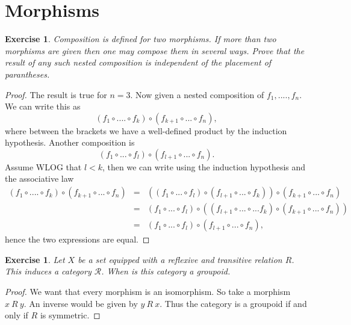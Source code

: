 \documentclass[a4paper, 11pt]{book}
\theoremstyle{plain}
\newtheorem{exercise}[theorem]{Exercise}
\theoremstyle{plain}
\begin{document}
\section{Morphisms}
\begin{exercise}
Composition is defined for two morphisms. If more than two morphisms are given then one may compose them in several ways. Prove that the result of any such nested composition is independent of the placement of parantheses.
\end{exercise}
\begin{proof}
The result is true for $n=3$. Now given a nested composition of $f_1, .... , f_n$. We can write this as
$$(f_1\circ ....\circ f_k)\circ (f_{k+1}\circ ...\circ f_n),$$
where between the brackets we have a well-defined product by the induction hypothesis.
Another composition is
$$(f_1\circ ...\circ f_l)\circ (f_{l+1}\circ ...\circ f_n).$$
Assume WLOG that $l<k$, then we can write using the induction hypothesis and the associative law
\begin{eqnarray*}
(f_1\circ ....\circ f_k)\circ (f_{k+1}\circ ...\circ f_n)
& = & ((f_1\circ ...\circ f_l)\circ (f_{l+1}\circ ...\circ f_k))\circ (f_{k+1}\circ ...\circ f_n)\\
& = & (f_1\circ ...\circ f_l)\circ ((f_{l+1}\circ ...\circ ... f_k)\circ (f_{k+1}\circ ...\circ f_n))\\
& = & (f_1\circ ... \circ f_l)\circ (f_{l+1}\circ ... \circ f_n),
\end{eqnarray*}
hence the two expressions are equal.
\end{proof}

\begin{exercise}
Let $X$ be a set equipped with a reflexive and transitive relation $R$. This induces a category $\mathcal{R}$. When is this category a groupoid.
\end{exercise}
\begin{proof}
We want that every morphism is an isomorphism. So take a morphism $x~R~y$. An inverse would be given by $y~R~x$. Thus the category is a groupoid if and only if $R$ is symmetric.
\end{proof}
\end{document}
